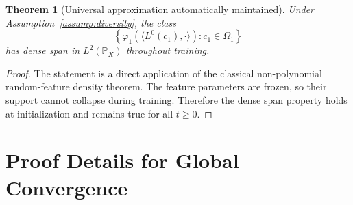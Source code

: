 \documentclass{article}
\newtheorem{theorem}{Theorem}[section]
\newcommand{\Pp}{\mathbb{P}}
\begin{document}
\begin{theorem}[Universal approximation automatically maintained]
\label{thm:uap-automatic}
Under Assumption~\ref{assump:diversity}, the class
\begin{equation}
\left\{\varphi_1\left(\langle L^0(c_1),\cdot\rangle\right):c_1\in\Omega_1\right\}
\end{equation}
has dense span in $L^2(\Pp_X)$ throughout training.
\end{theorem}

\begin{proof}
The statement is a direct application of the classical non-polynomial random-feature density theorem. The feature parameters are frozen, so their support cannot collapse during training. Therefore the dense span property holds at initialization and remains true for all $t\ge0$.
\end{proof}

\section{Proof Details for Global Convergence}
\label{app:global-proof}
\end{document}
